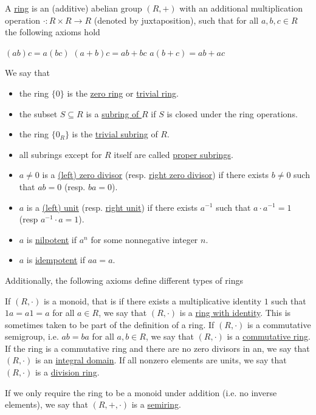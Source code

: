 \begin{definition}\label{def:ring}
  A \uline{ring} is an (additive) abelian group $(R, +)$ with an additional multiplication operation $\cdot: R \times R \to R$ (denoted by juxtaposition), such that for all $a, b, c \in R$ the following axioms hold
  \begin{description}
     $(ab)c = a(bc)$
     $(a + b)c = ab + bc$
     $a(b + c) = ab + ac$
  \end{description}

  We say that
  \begin{itemize}
    \item the ring $\{ 0 \}$ is the \uline{zero ring} or \uline{trivial ring}.
    \item the subset $S \subseteq R$ is a \uline{subring of $R$} if $S$ is closed under the ring operations.
    \item the ring $\{ 0_R \}$ is the \uline{trivial subring} of $R$.
    \item all subrings except for $R$ itself are called \uline{proper subrings}.
    \item $a \neq 0$ is a \uline{(left) zero divisor} (resp. \uline{right zero divisor}) if there exists $b \neq 0$ such that $ab = 0$ (resp. $ba = 0$).
    \item $a$ is a \uline{(left) unit} (resp. \uline{right unit}) if there exists $a^{-1}$ such that $a \cdot a^{-1} = 1$ (resp $a^{-1} \cdot a = 1$).
    \item $a$ is \uline{nilpotent} if $a^n$ for some nonnegative integer $n$.
    \item $a$ is \uline{idempotent} if $aa = a$.
  \end{itemize}

  Additionally, the following axioms define different types of rings
  \begin{description}
     If $(R, \cdot)$ is a monoid, that is if there exists a multiplicative identity $1$ such that $1a = a1 = a$ for all $a \in R$, we say that $(R, \cdot)$ is a \uline{ring with identity}. This is sometimes taken to be part of the definition of a ring.
     If $(R, \cdot)$ is a commutative semigroup, i.e. $ab = ba$ for all $a, b \in R$, we say that $(R, \cdot)$ is a \uline{commutative ring}.
     If the ring is a commutative ring and there are no zero divisors in an, we say that $(R, \cdot)$ is an \uline{integral domain}.
     If all nonzero elements are units, we say that $(R, \cdot)$ is a \uline{division ring}.
  \end{description}

  If we only require the ring to be a monoid under addition (i.e. no inverse elements), we say that $(R, +, \cdot)$ is a \uline{semiring}.
\end{definition}

